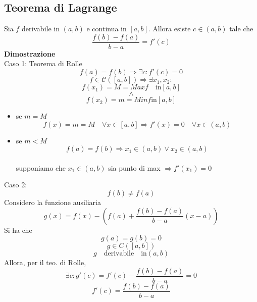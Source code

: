 \documentclass[12pt]{article}
\begin{document}
\subsection{Teorema di Lagrange}
Sia $f$ derivabile in $(a,b)$ e continua in $[a,b]$.
Allora esiste $c \in (a,b)$ tale che
\[ \frac{f(b)-f(a)}{b-a} = f'(c) \]
\textbf{Dimostrazione}\\
Caso 1: Teorema di Rolle
\[ f(a) = f(b) \Rightarrow \exists c: f'(c) = 0 \]
\[f \in \mathscr{C}([a,b]) \Rightarrow \exists x_1, x_2 :\] 
\[f(x_1) = M = Maxf \quad \text{in} [a,b] \]
\[\wedge\]
\[f(x_2) = m = Minf \text{in} [a,b] \]
\begin{itemize}
  \item se $m=M$
  \[ f(x) = m = M \quad \forall x \in [a,b] \Rightarrow f'(x) = 0 \quad \forall x \in (a,b) \]
  \item se $m<M$ 
  \[f(a) = f(b) \Rightarrow x_1 \in (a,b) \vee x_2 \in (a,b)\]\\
  supponiamo che $x_1 \in (a,b)$ sia punto di max $\Rightarrow f'(x_1)=0$
\end{itemize}
Caso 2: \[f(b) \neq f(a)\]Considero la funzione ausiliaria 
\[g(x) = f(x) -(f(a) + \frac{f(b) - f(a)}{b-a}(x-a))\]
Si ha che 
\[g(a) = g(b) = 0\] 
\[g \in C([a,b])\] 
\[g \quad \text{derivabile} \quad \text{in} (a,b)\]
Allora, per il teo. di Rolle, 
\[ \exists c: g'(c) = f'(c) - \frac{f(b)-f(a)}{b-a} = 0\]
\[f'(c) = \frac{f(b) - f(a)}{b-a}\]
\end{document}
